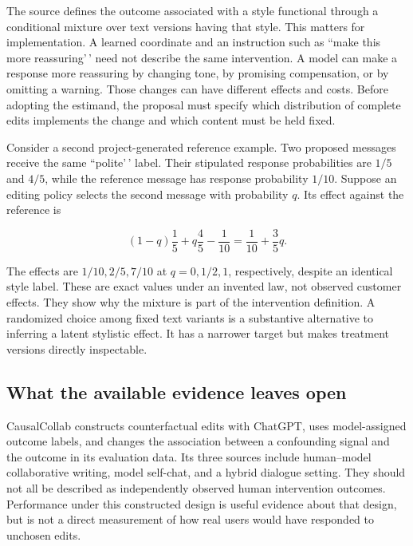 The source defines the outcome associated with a style functional
through a conditional mixture over text versions having that style. This
matters for implementation. A learned coordinate and an instruction such
as ``make this more reassuring'\,' need not describe the same
intervention. A model can make a response more reassuring by changing
tone, by promising compensation, or by omitting a warning. Those changes
can have different effects and costs. Before adopting the estimand, the
proposal must specify which distribution of complete edits implements
the change and which content must be held fixed.

Consider a second project-generated reference example. Two proposed
messages receive the same ``polite'\,' label. Their stipulated response
probabilities are \(1/5\) and \(4/5\), while the reference message has
response probability \(1/10\). Suppose an editing policy selects the
second message with probability \(q\). Its effect against the reference
is

\[
 (1-q)\frac15+q\frac45-\frac1{10}
 =\frac1{10}+\frac35q.
\]

The effects are \(1/10,2/5,7/10\) at \(q=0,1/2,1\), respectively,
despite an identical style label. These are exact values under an
invented law, not observed customer effects. They show why the mixture
is part of the intervention definition. A randomized choice among fixed
text variants is a substantive alternative to inferring a latent
stylistic effect. It has a narrower target but makes treatment versions
directly inspectable.

\hypertarget{what-the-available-evidence-leaves-open}{%
\subsection{What the available evidence leaves
open}\label{what-the-available-evidence-leaves-open}}

CausalCollab constructs counterfactual edits with ChatGPT, uses
model-assigned outcome labels, and changes the association between a
confounding signal and the outcome in its evaluation data. Its three
sources include human--model collaborative writing, model self-chat, and
a hybrid dialogue setting. They should not all be described as
independently observed human intervention outcomes. Performance under
this constructed design is useful evidence about that design, but is not
a direct measurement of how real users would have responded to unchosen
edits. \citep{exec13_census_collaboration}

